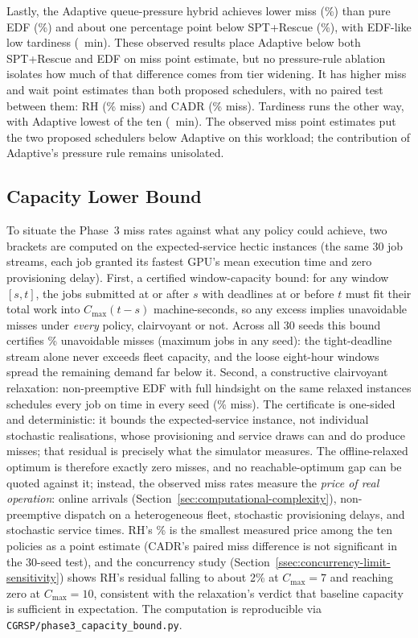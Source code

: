 {Lastly, the Adaptive queue-pressure hybrid achieves lower miss (\AdaptiveMiss\%) than pure EDF (\EDFmiss\%) and about one percentage point below SPT+Rescue (\RescueMiss\%), with EDF-like low tardiness (\AdaptiveTard~min). These observed results place Adaptive below both SPT+Rescue and EDF on miss point estimate, but no pressure-rule ablation isolates how much of that difference comes from tier widening. It has higher miss and wait point estimates than both proposed schedulers, with no paired test between them: RH (\RHMiss\% miss) and CADR (\CADRmiss\% miss). Tardiness runs the other way, with Adaptive lowest of the ten (\AdaptiveTard~min). The observed miss point estimates put the two proposed schedulers below Adaptive on this workload; the contribution of Adaptive's pressure rule remains unisolated.


\subsection{Capacity Lower Bound}
\label{ssec:capacity-lower-bound}

To situate the Phase~3 miss rates against what any policy could achieve, two brackets are computed on the expected-service hectic instances (the same 30 job streams, each job granted its fastest GPU's mean execution time and zero provisioning delay). First, a certified window-capacity bound: for any window $[s,t]$, the jobs submitted at or after $s$ with deadlines at or before $t$ must fit their total work into $C_{\max}(t-s)$ machine-seconds, so any excess implies unavoidable misses under \emph{every} policy, clairvoyant or not. Across all 30 seeds this bound certifies \CapBoundMeanPct\% unavoidable misses (maximum \CapBoundMaxMisses{} jobs in any seed): the tight-deadline stream alone never exceeds fleet capacity, and the loose eight-hour windows spread the remaining demand far below it. Second, a constructive clairvoyant relaxation: non-preemptive EDF with full hindsight on the same relaxed instances schedules every job on time in every seed (\RelaxEDFMeanPct\% miss). The certificate is one-sided and deterministic: it bounds the expected-service instance, not individual stochastic realisations, whose provisioning and service draws can and do produce misses; that residual is precisely what the simulator measures. The offline-relaxed optimum is therefore exactly zero misses, and no reachable-optimum gap can be quoted against it; instead, the observed miss rates measure the \emph{price of real operation}: online arrivals (Section~\ref{sec:computational-complexity}), non-preemptive dispatch on a heterogeneous fleet, stochastic provisioning delays, and stochastic service times. RH's \RHMiss\% is the smallest measured price among the ten policies as a point estimate (CADR's paired miss difference is not significant in the 30-seed test), and the concurrency study (Section~\ref{ssec:concurrency-limit-sensitivity}) shows RH's residual falling to about 2\% at $C_{\max}=7$ and reaching zero at $C_{\max}=10$, consistent with the relaxation's verdict that baseline capacity is sufficient in expectation. The computation is reproducible via \texttt{CGRSP/phase3\_capacity\_bound.py}.

}
